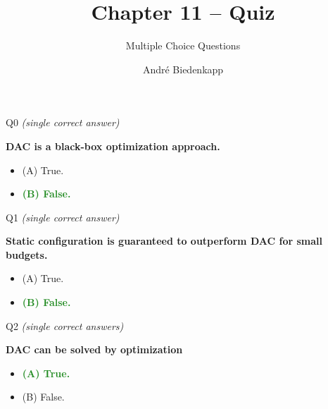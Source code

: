 \documentclass[main]{subfiles}
\title[AutoML: Dynamic Configuration]{Chapter 11 -- Quiz}
\subtitle{Multiple Choice Questions}
\author[André Biedenkapp]{André Biedenkapp}
\date{}
\newcommand{\correct}[1]{\textcolor{ForestGreen}{\textbf{#1} \checkmark}}
\newcommand{\wrong}[1]{#1}
\begin{document}
    \maketitle


\begin{frame}{Q0 \hfill \small\normalfont\textit{(single correct answer)}}

\textbf{DAC is a black-box optimization approach.}

\begin{itemize}
    \item \wrong{(A) \; True.}
    \item \correct{(B) \; False.}
\end{itemize}

\end{frame}
\begin{frame}{Q1 \hfill \small\normalfont\textit{(single correct answer)}}

\textbf{Static configuration is guaranteed to outperform DAC for small budgets.}

\begin{itemize}
    \item \wrong{(A) \; True.}
    \item \correct{(B) \; False.}
\end{itemize}

\end{frame}

\begin{frame}{Q2 \hfill \small\normalfont\textit{(single correct answers)}}

\textbf{DAC can be solved by optimization}

\begin{itemize}
    \item \correct{(A) \; True.}
    \item \wrong{(B) \; False.}
\end{itemize}

\end{frame}
\end{document}

